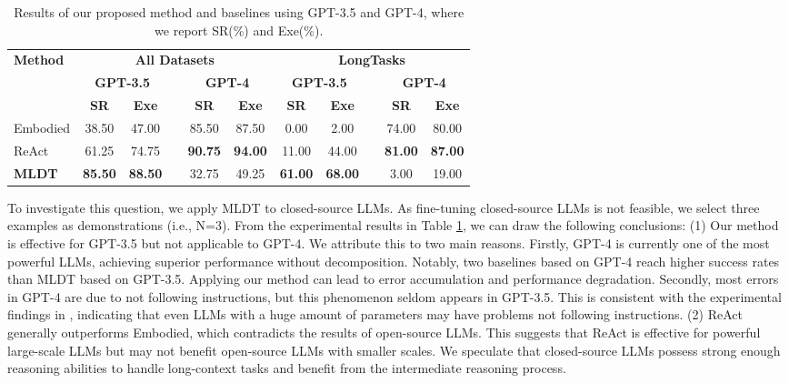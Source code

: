 \begin{table}[h]
\centering
\caption{Results of our proposed method and baselines using GPT-3.5 and GPT-4, where we report SR(\%) and Exe(\%).}
\begin{tabular}{l|ccccc|ccccc}
    \hline
    \multirow{3}{*}{\textbf{Method}}& \multicolumn{5}{c|}{\textbf{All Datasets}} & \multicolumn{5}{c}{\textbf{LongTasks}}\\
    \cline{2-11}
     & \multicolumn{2}{c}{\textbf{GPT-3.5}} & &\multicolumn{2}{c|}{\textbf{GPT-4}} &\multicolumn{2}{c}{\textbf{GPT-3.5}} && \multicolumn{2}{c}{\textbf{GPT-4}}\\
    & \textbf{SR} & \textbf{Exe} && \textbf{SR} & \textbf{Exe} & \textbf{SR} & \textbf{Exe} && \textbf{SR} & \textbf{Exe}\\
    \hline
    Embodied &38.50&47.00 &&85.50 &87.50 & 0.00&2.00 &&74.00 &80.00\\
    ReAct & 61.25&74.75 && \textbf{90.75}&\textbf{94.00} & 11.00&44.00 &&\textbf{81.00} &\textbf{87.00}\\
    \textbf{MLDT}& \textbf{85.50} & \textbf{88.50}&&32.75&49.25&\textbf{61.00} & \textbf{68.00}&&3.00 &19.00\\
    \hline
\end{tabular}
\label{Table 3}
\end{table}

To investigate this question, we apply MLDT to closed-source LLMs. As fine-tuning closed-source LLMs is not feasible, we select three examples as demonstrations (i.e., N=3). From the experimental results in Table \ref{Table 3}, we can draw the following conclusions: (1) Our method is effective for GPT-3.5 but not applicable to GPT-4. We attribute this to two main reasons. Firstly, GPT-4 is currently one of the most powerful LLMs, achieving superior performance without decomposition. Notably, two baselines based on GPT-4 reach higher success rates than MLDT based on GPT-3.5. Applying our method can lead to error accumulation and performance degradation. Secondly, most errors in GPT-4 are due to not following instructions, but this phenomenon seldom appears in GPT-3.5. This is consistent with the experimental findings in \cite{DBLP:journals/corr/abs-2304-03439,DBLP:journals/corr/abs-2307-10558}, indicating that even LLMs with a huge amount of parameters may have problems not following instructions. (2) ReAct generally outperforms Embodied, which contradicts the results of open-source LLMs. This suggests that ReAct is effective for powerful large-scale LLMs but may not benefit open-source LLMs with smaller scales. We speculate that closed-source LLMs possess strong enough reasoning abilities to handle long-context tasks and benefit from the intermediate reasoning process.\\

